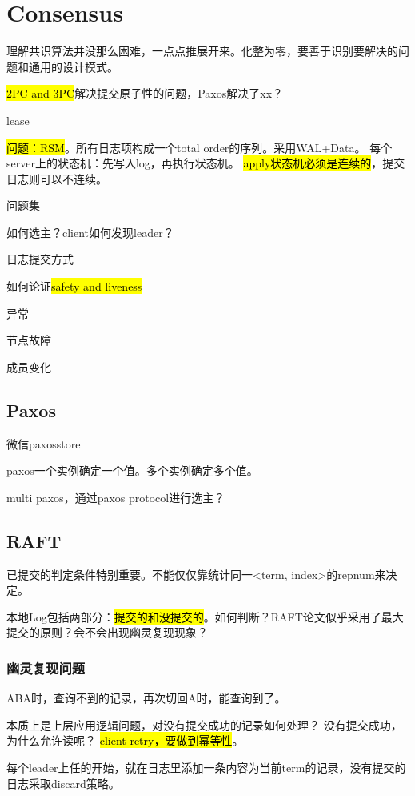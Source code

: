 \chapter{Consensus}

理解共识算法并没那么困难，一点点推展开来。化整为零，要善于识别要解决的问题和通用的设计模式。

\hl{2PC and 3PC}解决提交原子性的问题，Paxos解决了xx？

lease

\hl{问题：RSM}。所有日志项构成一个total order的序列。采用WAL+Data。
每个server上的状态机：先写入log，再执行状态机。
\hl{apply状态机必须是连续的}，提交日志则可以不连续。

问题集
\begin{enumbox}
\item 如何选主？client如何发现leader？
\item 日志提交方式
\item 如何论证\hl{safety and liveness}
\end{enumbox}

异常
\begin{enumbox}
\item 节点故障
\item 成员变化
\end{enumbox}

\section{Paxos}

微信paxosstore

paxos一个实例确定一个值。多个实例确定多个值。

multi paxos，通过paxos protocol进行选主？

\section{RAFT}

已提交的判定条件特别重要。不能仅仅靠统计同一<term, index>的repnum来决定。

本地Log包括两部分：\hl{提交的和没提交的}。如何判断？RAFT论文似乎采用了最大提交的原则？会不会出现幽灵复现现象？

\subsection{幽灵复现问题}

ABA时，查询不到的记录，再次切回A时，能查询到了。

本质上是上层应用逻辑问题，对没有提交成功的记录如何处理？
没有提交成功，为什么允许读呢？ \hl{client retry，要做到幂等性}。

每个leader上任的开始，就在日志里添加一条内容为当前term的记录，没有提交的日志采取discard策略。

